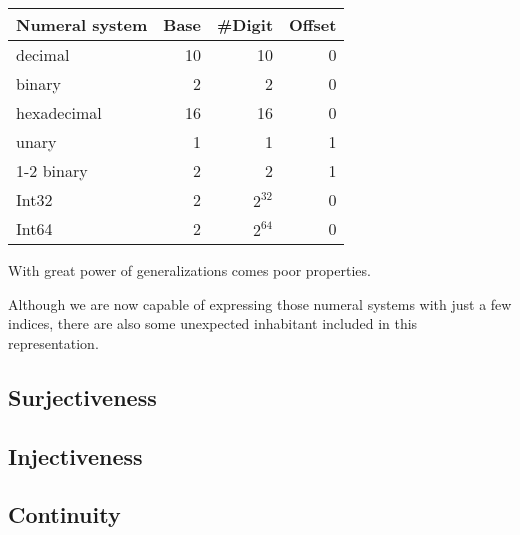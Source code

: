 \documentclass[\main/thesis.tex]{subfiles}
\begin{document}
\begin{center}
    \begin{adjustbox}{max width=\textwidth}
    \begin{tabular}{ | l | r | r | r | }
    \textbf{Numeral system} & \textbf{Base} & \textbf{\#Digit} & \textbf{Offset} \\
    \hline
    decimal         & 10 & 10 & 0 \\
    binary          & 2  & 2  & 0 \\
    hexadecimal     & 16 & 16 & 0 \\
    unary           & 1  & 1  & 1 \\
    1-2 binary      & 2  & 2  & 1 \\
    Int32           & 2  & $ 2^{32} $ & 0 \\
    Int64           & 2  & $ 2^{64} $ & 0 \\
    \end{tabular}
    \end{adjustbox}
\end{center}

With great power of generalizations comes poor properties.

Although we are now capable of expressing those numeral systems with just a few
indices, there are also some unexpected inhabitant included in this representation.

\subsection{Surjectiveness}
\subsection{Injectiveness}
\subsection{Continuity}
%
%
%
\end{document}
